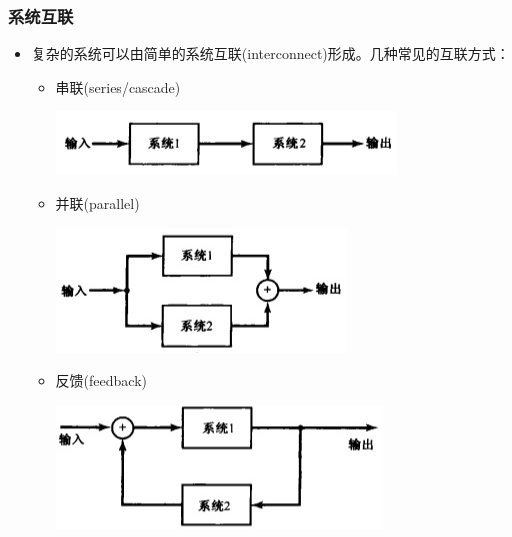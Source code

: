 \documentclass[CJKutf8,xcolor=pdftex,dvipsnames,table]{beamer}
\begin{document}
\begin{CJK*}{UTF8}{song}
  \begin{frame}
    \frametitle{系统互联}
    \begin{itemize}
    \item 复杂的系统可以由简单的系统互联(interconnect)形成。几种常见的互联方式：
        \begin{itemize}
        \item 串联(series/cascade)
    \begin{center}
      \includegraphics[scale=.5]{ss-c-f1-42a}
    \end{center}           
        \item 并联(parallel)
    \begin{center}
      \includegraphics[scale=.5]{ss-c-f1-42b}
    \end{center}           
        \item 反馈(feedback)
    \begin{center}
      \includegraphics[scale=.5]{ss-c-f1-43}
    \end{center}           
        \end{itemize}    
    \end{itemize} 
  \end{frame}
      

\end{CJK*}
\end{document}
